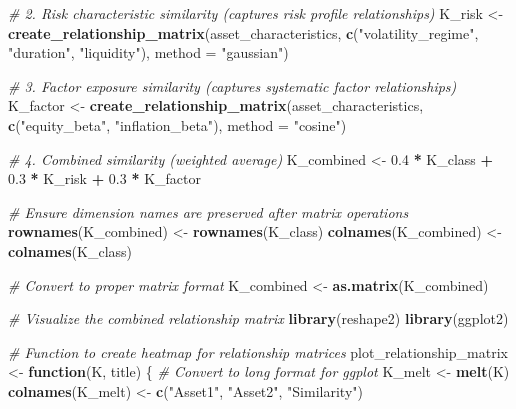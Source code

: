 \documentclass[
]{article}
\newenvironment{Shaded}{\begin{snugshade}}{\end{snugshade}}
\newcommand{\AttributeTok}[1]{\textcolor[rgb]{0.13,0.29,0.53}{#1}}
\newcommand{\CommentTok}[1]{\textcolor[rgb]{0.56,0.35,0.01}{\textit{#1}}}
\newcommand{\ControlFlowTok}[1]{\textcolor[rgb]{0.13,0.29,0.53}{\textbf{#1}}}
\newcommand{\FloatTok}[1]{\textcolor[rgb]{0.00,0.00,0.81}{#1}}
\newcommand{\FunctionTok}[1]{\textcolor[rgb]{0.13,0.29,0.53}{\textbf{#1}}}
\newcommand{\NormalTok}[1]{#1}
\newcommand{\OtherTok}[1]{\textcolor[rgb]{0.56,0.35,0.01}{#1}}
\newcommand{\SpecialCharTok}[1]{\textcolor[rgb]{0.81,0.36,0.00}{\textbf{#1}}}
\newcommand{\StringTok}[1]{\textcolor[rgb]{0.31,0.60,0.02}{#1}}
\begin{document}
\begin{Shaded}
\begin{Highlighting}[]
\CommentTok{\# 2. Risk characteristic similarity (captures risk profile relationships)}
\NormalTok{K\_risk }\OtherTok{\textless{}{-}} \FunctionTok{create\_relationship\_matrix}\NormalTok{(asset\_characteristics,}
                                    \FunctionTok{c}\NormalTok{(}\StringTok{"volatility\_regime"}\NormalTok{, }\StringTok{"duration"}\NormalTok{, }\StringTok{"liquidity"}\NormalTok{),}
                                    \AttributeTok{method =} \StringTok{"gaussian"}\NormalTok{)}

\CommentTok{\# 3. Factor exposure similarity (captures systematic factor relationships)}
\NormalTok{K\_factor }\OtherTok{\textless{}{-}} \FunctionTok{create\_relationship\_matrix}\NormalTok{(asset\_characteristics,}
                                      \FunctionTok{c}\NormalTok{(}\StringTok{"equity\_beta"}\NormalTok{, }\StringTok{"inflation\_beta"}\NormalTok{),}
                                      \AttributeTok{method =} \StringTok{"cosine"}\NormalTok{)}

\CommentTok{\# 4. Combined similarity (weighted average)}
\NormalTok{K\_combined }\OtherTok{\textless{}{-}} \FloatTok{0.4} \SpecialCharTok{*}\NormalTok{ K\_class }\SpecialCharTok{+} \FloatTok{0.3} \SpecialCharTok{*}\NormalTok{ K\_risk }\SpecialCharTok{+} \FloatTok{0.3} \SpecialCharTok{*}\NormalTok{ K\_factor}

\CommentTok{\# Ensure dimension names are preserved after matrix operations}
\FunctionTok{rownames}\NormalTok{(K\_combined) }\OtherTok{\textless{}{-}} \FunctionTok{rownames}\NormalTok{(K\_class)}
\FunctionTok{colnames}\NormalTok{(K\_combined) }\OtherTok{\textless{}{-}} \FunctionTok{colnames}\NormalTok{(K\_class)}

\CommentTok{\# Convert to proper matrix format}
\NormalTok{K\_combined }\OtherTok{\textless{}{-}} \FunctionTok{as.matrix}\NormalTok{(K\_combined)}

\CommentTok{\# Visualize the combined relationship matrix}
\FunctionTok{library}\NormalTok{(reshape2)}
\FunctionTok{library}\NormalTok{(ggplot2)}

\CommentTok{\# Function to create heatmap for relationship matrices}
\NormalTok{plot\_relationship\_matrix }\OtherTok{\textless{}{-}} \ControlFlowTok{function}\NormalTok{(K, title) \{}
  \CommentTok{\# Convert to long format for ggplot}
\NormalTok{  K\_melt }\OtherTok{\textless{}{-}} \FunctionTok{melt}\NormalTok{(K)}
  \FunctionTok{colnames}\NormalTok{(K\_melt) }\OtherTok{\textless{}{-}} \FunctionTok{c}\NormalTok{(}\StringTok{"Asset1"}\NormalTok{, }\StringTok{"Asset2"}\NormalTok{, }\StringTok{"Similarity"}\NormalTok{)}
  

\end{Highlighting}
\end{Shaded}
\end{document}
